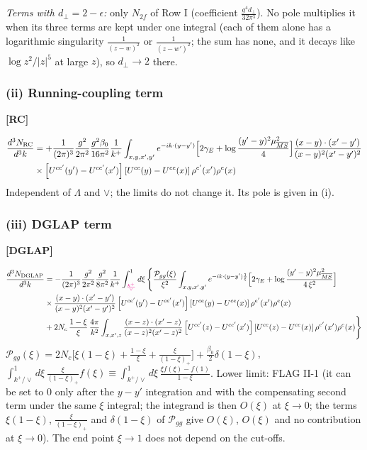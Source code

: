 \documentclass[9pt]{article}
\numberwithin{equation}{section}
\begin{document}
\noindent\emph{Terms with $d_{\perp}=2-\epsilon$:} only $N_{2f}$ of Row I (coefficient $\frac{g^{4}d_{\perp}}{32\pi^{5}}$). No pole multiplies it when its three terms are kept under one integral (each of them alone has a logarithmic singularity $\frac{1}{(z-w)^{2}}$ or $\frac{1}{(z-w')^{2}}$; the sum has none, and it decays like $\log z^{2}/|z|^{5}$ at large $z$), so $d_{\perp}\to2$ there.
\subsubsection{(ii) Running-coupling term}
\par\smallskip\noindent\textbf{[RC]}\par\nobreak
\begin{align}
\frac{d^{3}N_{\rm RC}}{d^{3}k} & = +\frac{1}{(2\pi)^{3}}\frac{g^{2}}{2\pi^{2}}\frac{g^{2}\beta_{0}}{16\pi^{2}}\frac{1}{k^{+}}\int_{x,y,x',y'}e^{-ik\cdot(y-y')}\Big[2\gamma_{E}+\log\frac{(y'-y)^{2}\mu^{2}_{\overline{MS}}}{4}\Big]\frac{(x-y)\cdot(x'-y')}{(x-y)^{2}(x'-y')^{2}}\notag \\ & \times\left[U^{ce'}(y') - U^{ce'}(x')\right]\left[U^{ce}(y) - U^{ce}(x)\right]\rho^{e'}(x')\rho^{e}(x)
\end{align}
\noindent Independent of $\Lambda$ and $\vee$; the limits do not change it. Its pole is given in (i).
\subsubsection{(iii) DGLAP term}
\par\smallskip\noindent\textbf{[DGLAP]}\par\nobreak
\begin{align}
\frac{d^{3}N_{\rm DGLAP}}{d^{3}k} & = -\frac{1}{(2\pi)^{3}}\frac{g^{2}}{2\pi^{2}}\frac{g^{2}}{8\pi^{2}}\frac{1}{k^{+}}\int_{{\color{magenta}\frac{k^{+}}{\vee}}}^{1}d\xi\,\Bigg\{\frac{\mathcal P_{gg}(\xi)}{\xi^{2}}\int_{x,y,x',y'}e^{-ik\cdot(y-y')\frac{1}{\xi}}\Big[2\gamma_{E}+\log\frac{(y'-y)^{2}\mu^{2}_{\overline{MS}}}{4\,\xi^{2}}\Big]\notag \\ & \times\frac{(x-y)\cdot(x'-y')}{(x-y)^{2}(x'-y')^{2}}\left[U^{ce'}(y') - U^{ce'}(x')\right]\left[U^{ce}(y) - U^{ce}(x)\right]\rho^{e'}(x')\rho^{e}(x)\notag \\ & +2N_{c}\,\frac{1-\xi}{\xi}\,\frac{4\pi}{k^{2}}\int_{x,x',z}\frac{(x-z)\cdot(x'-z)}{(x-z)^{2}(x'-z)^{2}}\left[U^{ce'}(z) - U^{ce'}(x')\right]\left[U^{ce}(z) - U^{ce}(x)\right]\rho^{e'}(x')\rho^{e}(x)\Bigg\}
\end{align}
\noindent $\mathcal P_{gg}(\xi)=2N_{c}\big[\xi(1-\xi)+\frac{1-\xi}{\xi}+\frac{\xi}{(1-\xi)_{+}}\big]+\frac{\beta_{0}}{2}\delta(1-\xi)$, $\int_{k^{+}/\vee}^{1}d\xi\,\frac{\xi}{(1-\xi)_{+}}f(\xi)\equiv\int_{k^{+}/\vee}^{1}d\xi\,\frac{\xi f(\xi)-f(1)}{1-\xi}$. Lower limit: FLAG II-1 (it can be set to $0$ only after the $y-y'$ integration and with the compensating second term under the same $\xi$ integral; the integrand is then $O(\xi)$ at $\xi\to0$; the terms $\xi(1-\xi)$, $\frac{\xi}{(1-\xi)_{+}}$ and $\delta(1-\xi)$ of $\mathcal P_{gg}$ give $O(\xi)$, $O(\xi)$ and no contribution at $\xi\to0$). The end point $\xi\to1$ does not depend on the cut-offs.
\end{document}
